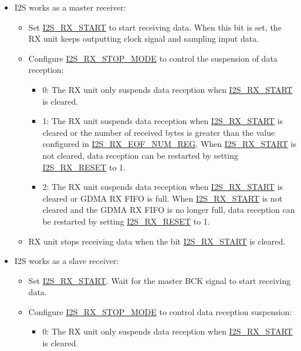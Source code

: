 \documentclass[main\_\_EN.tex]{subfiles}
\begin{document}
\begin{itemize}
    \item I2S works as a master receiver:
    \begin{itemize}
        \item Set \hyperref[fielddesc:I2SRXSTART]{I2S\_RX\_START} to start receiving data. When this bit is set, the RX unit keeps outputting clock signal and sampling input data.
        \item Configure \hyperref[fielddesc:I2SRXSTOPMODE]{I2S\_RX\_STOP\_MODE} to control the suspension of data reception:
        \begin{itemize}
            \item 0: The RX unit only suspends data reception when \hyperref[fielddesc:I2SRXSTART]{I2S\_RX\_START} is cleared.
            \item 1: The RX unit suspends data reception when \hyperref[fielddesc:I2SRXSTART]{I2S\_RX\_START} is cleared or the number of received bytes is greater than the value configured in \hyperref[regdesc:I2SRXEOFNUMREG]{I2S\_RX\_EOF\_NUM\_REG}. When \hyperref[fielddesc:I2SRXSTART]{I2S\_RX\_START} is not cleared, data reception can be restarted by setting \hyperref[fielddesc:I2SRXRESET]{I2S\_RX\_RESET} to 1.
            \item 2: The RX unit suspends data reception when \hyperref[fielddesc:I2SRXSTART]{I2S\_RX\_START} is cleared or GDMA RX FIFO is full. When \hyperref[fielddesc:I2SRXSTART]{I2S\_RX\_START} is not cleared and the GDMA RX FIFO is no longer full, data reception can be restarted by setting \hyperref[fielddesc:I2SRXRESET]{I2S\_RX\_RESET} to 1.
        \end{itemize}
        \item RX unit stops receiving data when the bit  \hyperref[fielddesc:I2SRXSTART]{I2S\_RX\_START} is cleared.
    \end{itemize}
    \item I2S works as a slave receiver:
    \begin{itemize}
        \item Set \hyperref[fielddesc:I2SRXSTART]{I2S\_RX\_START}. Wait for the master BCK signal to start receiving data.
        \item Configure \hyperref[fielddesc:I2SRXSTOPMODE]{I2S\_RX\_STOP\_MODE} to control data reception suspension:
        \begin{itemize}
            \item 0: The RX unit only suspends data reception when \hyperref[fielddesc:I2SRXSTART]{I2S\_RX\_START} is cleared.

\end{itemize}
\end{itemize}
\end{itemize}
\end{document}
